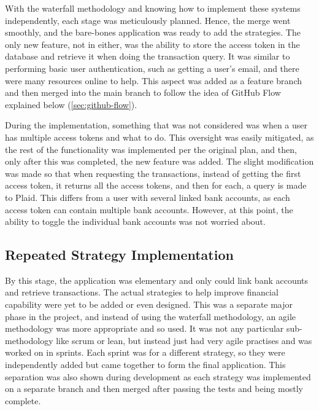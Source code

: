 With the waterfall methodology and knowing how to implement these systems independently, each stage was meticulously planned. Hence, the merge went smoothly, and the bare-bones application was ready to add the strategies. The only new feature, not in either, was the ability to store the access token in the database and retrieve it when doing the transaction query. It was similar to performing basic user authentication, such as getting a user's email, and there were many resources online to help. This aspect was added as a feature branch and then merged into the main branch to follow the idea of GitHub Flow explained below (\ref{sec:github-flow}).

During the implementation, something that was not considered was when a user has multiple access tokens and what to do. This oversight was easily mitigated, as the rest of the functionality was implemented per the original plan, and then, only after this was completed, the new feature was added. The slight modification was made so that when requesting the transactions, instead of getting the first access token, it returns all the access tokens, and then for each, a query is made to Plaid. This differs from a user with several linked bank accounts, as each access token can contain multiple bank accounts. However, at this point, the ability to toggle the individual bank accounts was not worried about.

\subsection{Repeated Strategy Implementation}
By this stage, the application was elementary and only could link bank accounts and retrieve transactions. The actual strategies to help improve financial capability were yet to be added or even designed. This was a separate major phase in the project, and instead of using the waterfall methodology, an agile methodology was more appropriate and so used. It was not any particular sub-methodology like scrum or lean, but instead just had very agile practises and was worked on in sprints. Each sprint was for a different strategy, so they were independently added but came together to form the final application. This separation was also shown during development as each strategy was implemented on a separate branch and then merged after passing the tests and being mostly complete.


